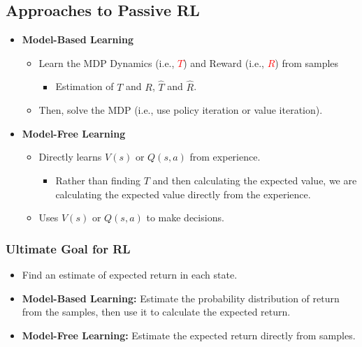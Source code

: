 \subsection{Approaches to Passive RL}
\begin{definition}
    \begin{itemize}
        \item \textbf{Model-Based Learning}
        \begin{itemize}
            \item Learn the MDP Dynamics (i.e., \textcolor{red}{$T$}) and Reward (i.e., \textcolor{red}{$R$}) from samples 
            \begin{itemize}
                \item Estimation of $T$ and $R$, $\hat{T}$ and $\hat{R}$.
            \end{itemize}
            \item Then, solve the MDP (i.e., use policy iteration or value iteration).
        \end{itemize}
        \item \textbf{Model-Free Learning}
        \begin{itemize}
            \item Directly learns $V(s)$ or $Q(s, a)$ from experience.
            \begin{itemize}
                \item Rather than finding $T$ and then calculating the expected value, we are calculating the expected value directly from the experience.
            \end{itemize}
            \item Uses $V(s)$ or $Q(s, a)$ to make decisions.
        \end{itemize}
    \end{itemize}
\end{definition}

\subsubsection{Ultimate Goal for RL}
\begin{intuition}
    \begin{itemize}
        \item Find an estimate of expected return in each state.
        \item \textbf{Model-Based Learning:} Estimate the probability distribution of return from the samples, then use it to calculate the expected return.
        \item \textbf{Model-Free Learning:} Estimate the expected return directly from samples.
    \end{itemize}
\end{intuition}

